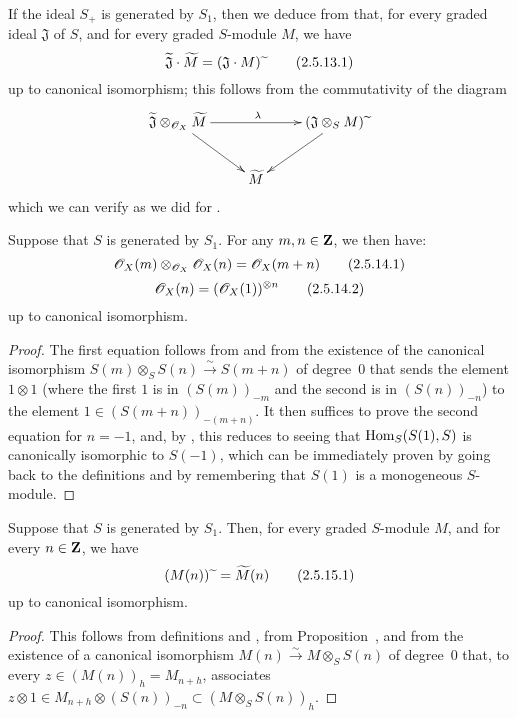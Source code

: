 If the ideal $S_+$ is generated by $S_1$, then we deduce from  that, for every graded ideal $\mathfrak{J}$ of $S$, and for every graded $S$-module $M$, we have
\[
\label{II.2.5.13.1}
  \widetilde{\mathfrak{J}}\cdot\widetilde{M} = (\mathfrak{J}\cdot M){\,\widetilde{\,}\,}
\tag{2.5.13.1}
\]
up to canonical isomorphism;
this follows from the commutativity of the diagram
\[
  \xymatrix{
    \widetilde{\mathfrak{J}}\otimes_{\sh{O}_X}\widetilde{M} \ar[rr]^\lambda \ar[dr]
    && (\mathfrak{J}\otimes_S M)\supertilde \ar[dl]
  \\&\widetilde{M}
  }
\]
which we can verify as we did for .

\begin{corollary}[2.5.14]
\label{II.2.5.14}
Suppose that $S$ is generated by $S_1$.
For any $m,n\in\mathbf{Z}$, we then have:
\[
\label{II.2.5.14.1}
  \mathscr{O}_X(m)\otimes_{\mathscr{O}_X}\mathscr{O}_X(n) = \mathscr{O}_X(m+n)
\tag{2.5.14.1}
\]
\[
\label{II.2.5.14.2}
  \mathscr{O}_X(n) = (\mathscr{O}_X(1))^{\otimes n}
\tag{2.5.14.2}
\]
up to canonical isomorphism.
\end{corollary}

\begin{proof}
The first equation follows from  and from the existence of the canonical isomorphism $S(m)\otimes_S S(n)\xrightarrow{\sim}S(m+n)$ of degree~$0$ that sends the element $1\otimes1$ (where the first $1$ is in $(S(m))_{-m}$ and the second is in $(S(n))_{-n}$) to the element $1\in(S(m+n))_{-(m+n)}$.
It then suffices to prove the second equation for $n=-1$, and, by , this reduces to seeing that $\operatorname{Hom}_S(S(1),S)$ is canonically isomorphic to $S(-1)$, which can be immediately proven by going back to the definitions  and by remembering that $S(1)$ is a monogeneous $S$-module.
\end{proof}

\begin{corollary}[2.5.15]
\label{II.2.5.15}
Suppose that $S$ is generated by $S_1$.
Then, for every graded $S$-module $M$, and for every $n\in\mathbf{Z}$, we have
\[
\label{II.2.5.15.1}
  (M(n)){\,\widetilde{\,}\,} = \widetilde{M}(n)
\tag{2.5.15.1}
\]
up to canonical isomorphism.
\end{corollary}

\begin{proof}
This follows from definitions  and , from Proposition~, and from the existence of a canonical isomorphism $M(n)\xrightarrow{\sim}M\otimes_S S(n)$ of degree~$0$ that, to every $z\in(M(n))_h=M_{n+h}$, associates $z\otimes1\in M_{n+h}\otimes(S(n))_{-n}\subset(M\otimes_S S(n))_h$.
\end{proof}

